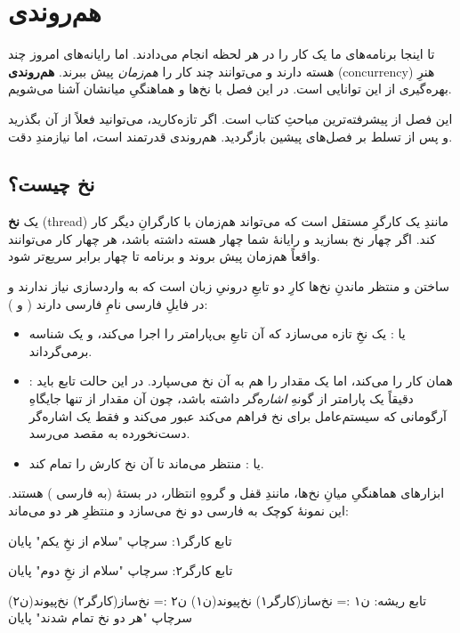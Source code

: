 \chapter{هم‌روندی}%
\label{ch:concurrency}

تا اینجا برنامه‌های ما یک کار را در هر لحظه انجام می‌دادند. اما رایانه‌های امروز
چند هسته دارند و می‌توانند چند کار را \emph{هم‌زمان} پیش ببرند. \textbf{هم‌روندی}
(concurrency) هنرِ بهره‌گیری از این توانایی است. در این فصل با نخ‌ها و
هماهنگیِ میانشان آشنا می‌شویم.

\begin{warn}
این فصل از پیشرفته‌ترین مباحثِ کتاب است. اگر تازه‌کارید، می‌توانید فعلاً از آن
بگذرید و پس از تسلط بر فصل‌های پیشین بازگردید. هم‌روندی قدرتمند است، اما نیازمندِ
دقت.
\end{warn}

\section{نخ چیست؟}

یک \textbf{نخ} (thread) مانندِ یک کارگرِ مستقل است که می‌تواند هم‌زمان با
کارگرانِ دیگر کار کند. اگر چهار نخ بسازید و رایانهٔ شما چهار هسته داشته باشد،
هر چهار کار می‌توانند واقعاً هم‌زمان پیش بروند و برنامه تا چهار برابر
سریع‌تر شود.

ساختن و منتظر ماندنِ نخ‌ها کارِ دو تابعِ درونیِ زبان است که به واردسازی نیاز
ندارند و در فایلِ فارسی نامِ فارسی دارند ( و ):
\begin{itemize}
  \item {} یا : یک نخِ تازه می‌سازد که آن
        تابعِ بی‌پارامتر را اجرا می‌کند، و یک شناسه برمی‌گرداند.
  \item {}: همان کار را می‌کند، اما یک مقدار را هم به آن
        نخ می‌سپارد. در این حالت تابع باید دقیقاً یک پارامتر از گونهِ
        \emph{اشاره‌گر} داشته باشد، چون آن مقدار از تنها جایگاهِ آرگومانی که
        سیستم‌عامل برای نخ فراهم می‌کند عبور می‌کند و فقط یک اشاره‌گر
        دست‌نخورده به مقصد می‌رسد.
  \item {} یا : منتظر می‌ماند تا آن نخ
        کارش را تمام کند.
\end{itemize}

ابزارهای هماهنگیِ میانِ نخ‌ها، مانندِ قفل و گروهِ انتظار، در بستهٔ 
(به فارسی ) هستند. این نمونهٔ کوچک به فارسی دو نخ می‌سازد و
منتظرِ هر دو می‌ماند:

\begin{salamfa}
تابع کارگر۱:
    سرچاپ "سلام از نخِ یکم"
پایان

تابع کارگر۲:
    سرچاپ "سلام از نخِ دوم"
پایان

تابع ریشه:
    ن۱ := نخ‌ساز(کارگر۱)
    نخ‌پیوند(ن۱)
    ن۲ := نخ‌ساز(کارگر۲)
    نخ‌پیوند(ن۲)
    سرچاپ "هر دو نخ تمام شدند"
پایان
\end{salamfa}

